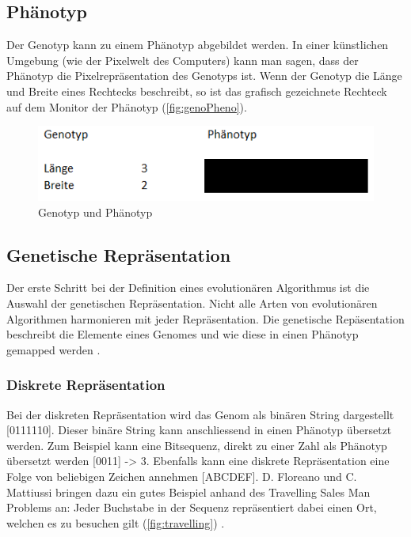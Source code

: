     \subsection{Phänotyp\label{sub:phenotyp}}
        Der Genotyp kann zu einem Phänotyp abgebildet werden.
        In einer künstlichen Umgebung (wie der Pixelwelt des Computers) kann man sagen,
        dass der Phänotyp die Pixelrepräsentation des Genotyps ist.
        Wenn der Genotyp die Länge und Breite eines Rechtecks beschreibt, so ist das grafisch gezeichnete Rechteck auf dem Monitor der Phänotyp (\vref{fig:genoPheno}).
        \begin{figure}[H]
          \includegraphics[scale=1]{graphics/genotyp_phenotyp}
          \caption{Genotyp und Phänotyp\label{fig:genoPheno}}
        \end{figure}

    \subsection{Genetische Repräsentation}

    Der erste Schritt bei der Definition eines evolutionären Algorithmus ist die Auswahl der genetischen Repräsentation.
    Nicht alle Arten von evolutionären Algorithmen harmonieren mit jeder Repräsentation.
    Die genetische Repäsentation beschreibt die Elemente eines Genomes und wie diese in einen Phänotyp gemapped werden \cite[S.16]{book:bioInspired}.

      \subsubsection{Diskrete Repräsentation\label{par:GeneticRepresentationDiscrete}}

        Bei der diskreten Repräsentation wird das Genom als binären String dargestellt [0111110].
        Dieser binäre String kann anschliessend in einen Phänotyp übersetzt werden.
        Zum Beispiel kann eine Bitsequenz, direkt zu einer Zahl als Phänotyp übersetzt werden [0011] -> 3.
        Ebenfalls kann eine diskrete Repräsentation eine Folge von beliebigen Zeichen annehmen [ABCDEF].
        D. Floreano und C. Mattiussi bringen dazu ein gutes Beispiel anhand des Travelling Sales Man Problems an:
        Jeder Buchstabe in der Sequenz repräsentiert dabei einen Ort, welchen es zu besuchen gilt (\vref{fig:travelling}) \cite[S.18]{book:bioInspired}.

